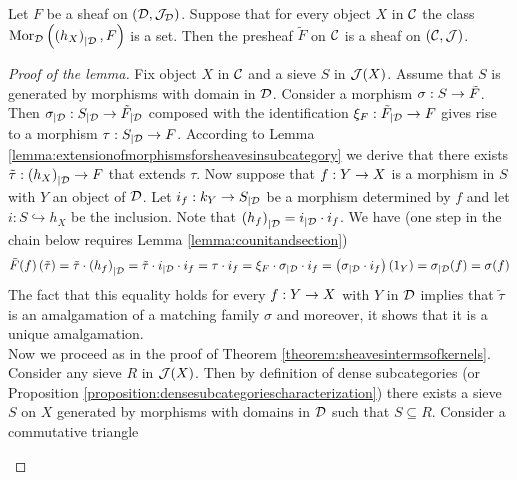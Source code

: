 \begin{lemma}\label{lemma:extensionofsheafissheaf}
Let $F$ be a sheaf on $({\mathcal D},{\mathcal J}_{{\mathcal D}})$. Suppose that for every object $X$ in ${\mathcal C}$ the class $\mathrm{Mor}_{{\mathcal D}}\left(\left(h_X\right)_{\mid {\mathcal D}},F\right)$ is a set. Then the presheaf $\tilde{F}$ on ${\mathcal C}$ is a sheaf on $({\mathcal C},{\mathcal J})$.
\end{lemma}
\begin{proof}[Proof of the lemma]
Fix object $X$ in ${\mathcal C}$ and a sieve $S$ in ${\mathcal J}(X)$. Assume that $S$ is generated by morphisms with domain in ${\mathcal D}$. Consider a morphism $\sigma:S\rightarrow \tilde{F}$. Then $\sigma_{\mid {\mathcal D}}:S_{\mid {\mathcal D}}\rightarrow \tilde{F}_{\mid {\mathcal D}}$ composed with the identification $\xi_F:\tilde{F}_{\mid {\mathcal D}}\rightarrow F$ gives rise to a morphism $\tau:S_{\mid {\mathcal D}}\rightarrow F$. According to Lemma \ref{lemma:extensionofmorphismsforsheavesinsubcategory} we derive that there exists $\tilde{\tau}:\left(h_X\right)_{\mid {\mathcal D}}\rightarrow F$ that extends $\tau$. Now suppose that $f:Y\rightarrow X$ is a morphism in $S$ with $Y$ an object of ${\mathcal D}$. Let $i_f:k_Y\rightarrow S_{\mid {\mathcal D}}$ be a morphism determined by $f$ and let $i:S\hookrightarrow h_X$ be the inclusion. Note that $\left(h_f\right)_{\mid {\mathcal D}} = i_{\mid {\mathcal D}}\cdot i_f$. We have (one step in the chain below requires Lemma \ref{lemma:counitandsection})
$$\tilde{F}(f)\left(\tilde{\tau}\right) =\tilde{\tau}\cdot \left(h_f\right)_{\mid {\mathcal D}} = \tilde{\tau}\cdot i_{\mid {\mathcal D}}\cdot i_{f} = \tau\cdot i_{f} = \xi_F\cdot \sigma_{\mid {\mathcal D}}\cdot i_f = \left( \sigma_{\mid {\mathcal D}}\cdot i_f \right)(1_Y) = \sigma_{\mid {\mathcal D}}(f) = \sigma(f)$$
The fact that this equality holds for every $f:Y\rightarrow X$ with $Y$ in ${\mathcal D}$ implies that $\tilde{\tau}$ is an amalgamation of a matching family $\sigma$ and moreover, it shows that it is a unique amalgamation.\\
Now we proceed as in the proof of Theorem \ref{theorem:sheavesintermsofkernels}. Consider any sieve $R$ in ${\mathcal J}(X)$. Then by definition of dense subcategories (or Proposition \ref{proposition:densesubcategoriescharacterization}) there exists a sieve $S$ on $X$ generated by morphisms with domains in ${\mathcal D}$ such that $S\subseteq R$. Consider a commutative triangle
\begin{center}
\end{center}
\end{proof}
